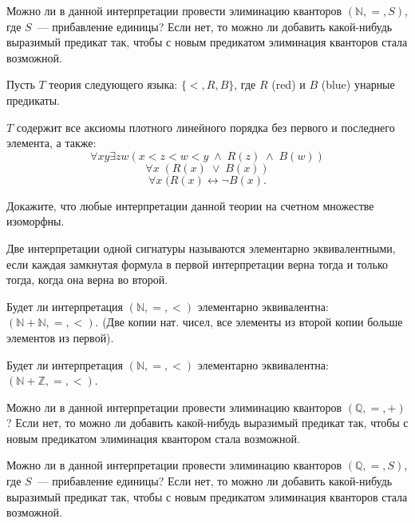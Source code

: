 
\begin{task}
    Можно ли в данной интерпретации провести элиминацию кванторов $(\mathbb{N}, =, S)$, где $S$~--- прибавление единицы? Если нет,
    то можно ли добавить какой-нибудь выразимый предикат так, чтобы с новым предикатом элиминация кванторов стала возможной.
\end{task}

\begin{task}
    Пусть $T$ теория следующего языка: $\{<, R, B\}$, где $R$ (red) и $B$ (blue)
    унарные предикаты.
    
	$T$ содержит все аксиомы плотного линейного порядка без первого и последнего элемента, а также:
	\[ \forall xy \exists zw (x < z < w < y \; \wedge \; R(z) \; \wedge \; B(w)) \]
	\[ \forall x \; (R(x)\; \vee \; B(x)) \]
	\[ \forall x \; (R(x) \leftrightarrow \neg B(x). \]
    
	Докажите, что любые интерпретации данной теории на счетном множестве изоморфны.
\end{task}


Две интерпретации одной сигнатуры называются элементарно
эквивалентными, если каждая замкнутая формула в первой интерпретации
верна тогда и только тогда, когда она верна во второй.

\begin{task}
    Будет ли интерпретация $(\mathbb{N}, =, <)$ элементарно эквивалентна: $(\mathbb{N} + \mathbb{N}, =, <)$. (Две копии
    нат. чисел, все элементы из второй копии больше элементов из первой).
\end{task}

\begin{task}
    Будет ли интерпретация $(\mathbb{N}, =, <)$ элементарно эквивалентна: $(\mathbb{N} + \mathbb{Z}, =, <)$.
\end{task}


\breakline


\begin{ptask}{46}
    Можно ли в данной интерпретации провести элиминацию кванторов $(\mathbb{Q}, =, +)$? Если нет, то можно ли добавить какой-нибудь
    выразимый предикат так, чтобы с новым предикатом элиминация квантором стала возможной.
\end{ptask}

\begin{ptask}{47}
    Можно ли в данной интерпретации провести элиминацию кванторов $(\mathbb{Q}, =, S)$, где $S$~--- прибавление единицы? Если нет,
    то можно ли добавить какой-нибудь выразимый предикат так, чтобы с новым предикатом элиминация кванторов стала возможной.
\end{ptask}
